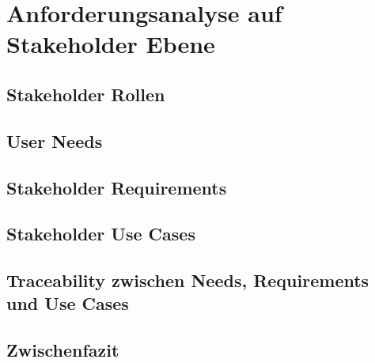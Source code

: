 \section{Anforderungsanalyse auf Stakeholder Ebene}
\subsection{Stakeholder Rollen}
\subsection{User Needs}
\subsection{Stakeholder Requirements}
\subsection{Stakeholder Use Cases}
\subsection{Traceability zwischen Needs, Requirements und Use Cases}
\subsection{Zwischenfazit}